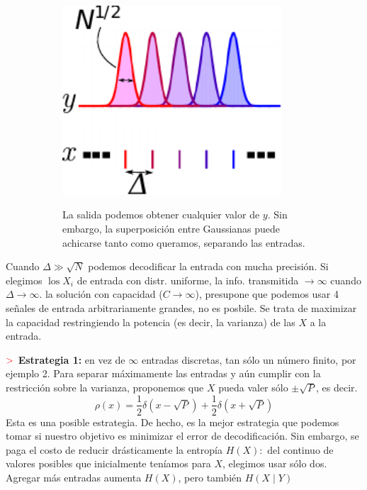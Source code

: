 \documentclass[%
 reprint,
 amsmath,amssymb,
 aps,
]{revtex4-1}
\begin{document}
\begin{figure}[!ht]
  \begin{subfigure}{0.2\textwidth}
    \centering
    \includegraphics[width = 0.9\textwidth]{canalGaussiano.pdf}
  \end{subfigure}\qquad
  \begin{subfigure}{0.2\textwidth}
    La salida podemos obtener cualquier valor de $y$. Sin embargo, la superposición entre Gaussianas puede
    achicarse tanto como queramos, separando las entradas. 
  \end{subfigure}
\end{figure}
Cuando $\Delta \gg \sqrt{N}$ podemos
decodificar la entrada con mucha precisión. 
Si elegimos $\operatorname{los} X_{i}$ de entrada con distr. uniforme, la info. transmitida $\rightarrow \infty$ cuando $\Delta \rightarrow \infty$. 
la solución con capacidad ($C\rightarrow \infty$), presupone que podemos usar 4 señales de entrada arbitrariamente grandes, no es posbile. Se trata de maximizar la capacidad restringiendo la potencia (es decir, la varianza) de las $X$ a la entrada. 

\textbf{$\textcolor{red}{\mathbf{>}}$ Estrategia 1:}
en vez de $\infty$ entradas discretas, tan sólo un número finito, por
ejemplo 2. Para separar máximamente las entradas y aún cumplir con la restricción sobre la varianza, proponemos que $X$ pueda valer sólo $\pm \sqrt{P}$, es decir.
$$
\rho(x)=\frac{1}{2} \delta(x-\sqrt{P})+\frac{1}{2} \delta(x+\sqrt{P})
$$
Esta es una posible estrategia. De hecho, es la mejor estrategia que podemos tomar si nuestro objetivo
es minimizar el error de decodificación. Sin embargo, se paga el costo de reducir drásticamente la entropía $H(X):$ del continuo de valores posibles que inicialmente teníamos para $X$, elegimos usar sólo
dos. Agregar más entradas aumenta $H(X)$, pero también $H(X \mid Y)$
\end{document}
